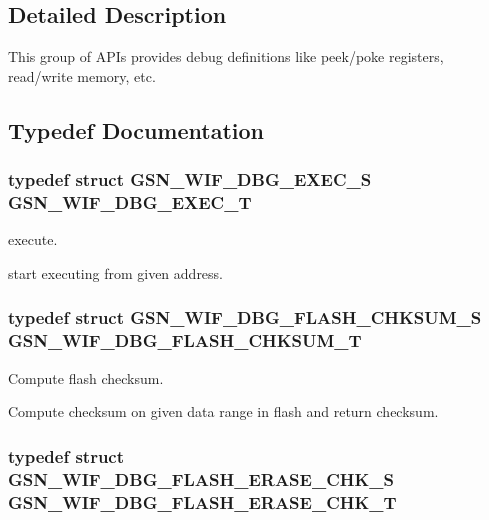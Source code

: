 \subsection{Detailed Description}
This group of APIs provides debug definitions like peek/poke registers, read/write memory, etc. 

\subsection{Typedef Documentation}
\hypertarget{a00637_ga0274185c1f8a4b9afb38a595ca615405}{
\subsubsection[{GSN\_\-WIF\_\-DBG\_\-EXEC\_\-T}]{\setlength{\rightskip}{0pt plus 5cm}typedef struct {\bf GSN\_\-WIF\_\-DBG\_\-EXEC\_\-S}  {\bf GSN\_\-WIF\_\-DBG\_\-EXEC\_\-T}}}
\label{a00637_ga0274185c1f8a4b9afb38a595ca615405}


execute. 

start executing from given address. \hypertarget{a00637_gae6d33809d08da1c3b8849bf9c186f2fa}{
\subsubsection[{GSN\_\-WIF\_\-DBG\_\-FLASH\_\-CHKSUM\_\-T}]{\setlength{\rightskip}{0pt plus 5cm}typedef struct {\bf GSN\_\-WIF\_\-DBG\_\-FLASH\_\-CHKSUM\_\-S}  {\bf GSN\_\-WIF\_\-DBG\_\-FLASH\_\-CHKSUM\_\-T}}}
\label{a00637_gae6d33809d08da1c3b8849bf9c186f2fa}


Compute flash checksum. 

Compute checksum on given data range in flash and return checksum. \hypertarget{a00637_gaa7c0146330fb5ac3b4707339435d871d}{
\subsubsection[{GSN\_\-WIF\_\-DBG\_\-FLASH\_\-ERASE\_\-CHK\_\-T}]{\setlength{\rightskip}{0pt plus 5cm}typedef struct {\bf GSN\_\-WIF\_\-DBG\_\-FLASH\_\-ERASE\_\-CHK\_\-S}  {\bf GSN\_\-WIF\_\-DBG\_\-FLASH\_\-ERASE\_\-CHK\_\-T}}}
\label{a00637_gaa7c0146330fb5ac3b4707339435d871d}


